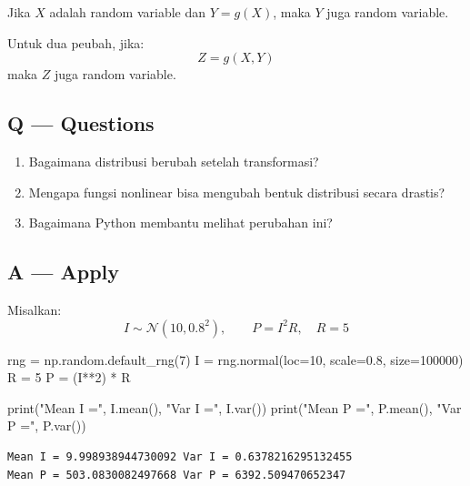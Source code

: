 \documentclass[
  letterpaper,
  DIV=11,
  numbers=noendperiod]{scrreprt}
\newenvironment{Shaded}{\begin{snugshade}}{\end{snugshade}}
\newcommand{\BuiltInTok}[1]{\textcolor[rgb]{0.00,0.23,0.31}{#1}}
\newcommand{\DecValTok}[1]{\textcolor[rgb]{0.68,0.00,0.00}{#1}}
\newcommand{\FloatTok}[1]{\textcolor[rgb]{0.68,0.00,0.00}{#1}}
\newcommand{\NormalTok}[1]{\textcolor[rgb]{0.00,0.23,0.31}{#1}}
\newcommand{\OperatorTok}[1]{\textcolor[rgb]{0.37,0.37,0.37}{#1}}
\newcommand{\StringTok}[1]{\textcolor[rgb]{0.13,0.47,0.30}{#1}}
\providecommand{\tightlist}{%
  \setlength{\itemsep}{0pt}\setlength{\parskip}{0pt}}
\begin{document}
Jika \(X\) adalah random variable dan \(Y=g(X)\), maka \(Y\) juga random
variable.

Untuk dua peubah, jika: \[
Z = g(X,Y)
\] maka \(Z\) juga random variable.

\subsection{Q --- Questions}\label{q-questions-38}

\begin{enumerate}
\def\labelenumi{\arabic{enumi}.}
\tightlist
\item
  Bagaimana distribusi berubah setelah transformasi?
\item
  Mengapa fungsi nonlinear bisa mengubah bentuk distribusi secara
  drastis?
\item
  Bagaimana Python membantu melihat perubahan ini?
\end{enumerate}

\subsection{A --- Apply}\label{a-apply-37}

Misalkan: \[
I \sim \mathcal{N}(10, 0.8^2), \qquad P = I^2R, \quad R=5
\]

\begin{Shaded}
\begin{Highlighting}[]
\NormalTok{rng }\OperatorTok{=}\NormalTok{ np.random.default\_rng(}\DecValTok{7}\NormalTok{)}
\NormalTok{I }\OperatorTok{=}\NormalTok{ rng.normal(loc}\OperatorTok{=}\DecValTok{10}\NormalTok{, scale}\OperatorTok{=}\FloatTok{0.8}\NormalTok{, size}\OperatorTok{=}\DecValTok{100000}\NormalTok{)}
\NormalTok{R }\OperatorTok{=} \DecValTok{5}
\NormalTok{P }\OperatorTok{=}\NormalTok{ (I}\OperatorTok{**}\DecValTok{2}\NormalTok{) }\OperatorTok{*}\NormalTok{ R}

\BuiltInTok{print}\NormalTok{(}\StringTok{"Mean I ="}\NormalTok{, I.mean(), }\StringTok{"Var I ="}\NormalTok{, I.var())}
\BuiltInTok{print}\NormalTok{(}\StringTok{"Mean P ="}\NormalTok{, P.mean(), }\StringTok{"Var P ="}\NormalTok{, P.var())}
\end{Highlighting}
\end{Shaded}

\begin{verbatim}
Mean I = 9.998938944730092 Var I = 0.6378216295132455
Mean P = 503.0830082497668 Var P = 6392.509470652347
\end{verbatim}
\end{document}

